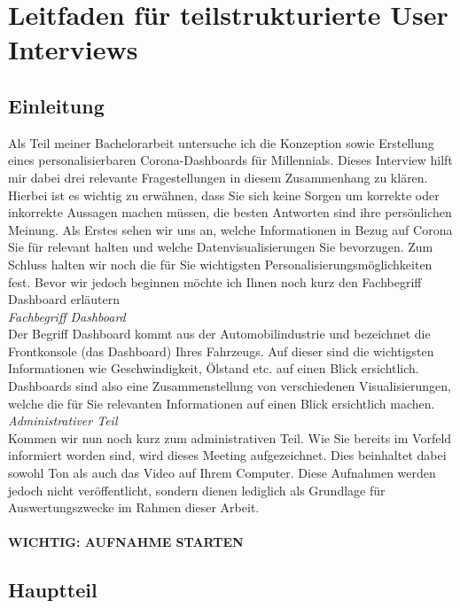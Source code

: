 \section{Leitfaden für teilstrukturierte User Interviews} \label{app:user_interview_guide}

\subsection{Einleitung}
Als Teil meiner Bachelorarbeit untersuche ich die Konzeption sowie Erstellung eines personalisierbaren Corona-Dashboards für Millennials. Dieses Interview hilft mir dabei drei relevante Fragestellungen in diesem Zusammenhang zu klären. Hierbei ist es wichtig zu erwähnen, dass Sie sich keine Sorgen um korrekte oder inkorrekte Aussagen machen müssen, die besten Antworten sind ihre persönlichen Meinung. Als Erstes sehen wir uns an, welche Informationen in Bezug auf Corona Sie für relevant halten und welche Datenvisualisierungen Sie bevorzugen. Zum Schluss halten wir noch die für Sie wichtigsten Personalisierungsmöglichkeiten fest. Bevor wir jedoch beginnen möchte ich Ihnen noch kurz den Fachbegriff Dashboard erläutern
\\

\textit{Fachbegriff Dashboard}
\\
Der Begriff Dashboard kommt aus der Automobilindustrie und bezeichnet die Frontkonsole (das Dashboard) Ihres Fahrzeugs. Auf dieser sind die wichtigsten Informationen wie Geschwindigkeit, Ölstand etc. auf einen Blick ersichtlich. Dashboards sind also eine Zusammenstellung von verschiedenen Visualisierungen, welche die für Sie relevanten Informationen auf einen Blick ersichtlich machen.\\


\textit{Administrativer Teil}
\\
Kommen wir nun noch kurz zum administrativen Teil. Wie Sie bereits im Vorfeld informiert worden sind, wird dieses Meeting aufgezeichnet. Dies beinhaltet dabei sowohl Ton als auch das Video auf Ihrem Computer. Diese Aufnahmen werden jedoch nicht veröffentlicht, sondern dienen lediglich als Grundlage für Auswertungszwecke im Rahmen dieser Arbeit.\\\\
\textbf{WICHTIG: AUFNAHME STARTEN}


\clearpage
\subsection{Hauptteil}

